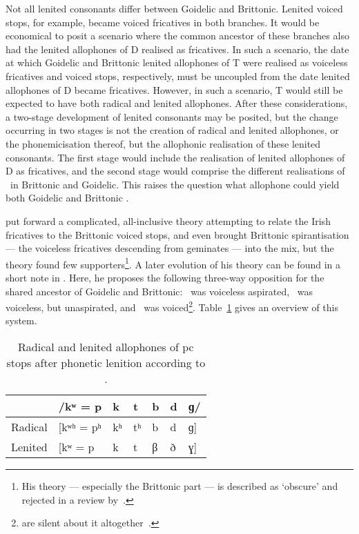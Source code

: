 Not all lenited consonants differ between Goidelic and Brittonic. Lenited voiced stops, for example, became voiced fricatives in both branches. It would be economical to posit a scenario where the common ancestor of these branches also had the lenited allophones of \gls{D} realised as fricatives. In such a scenario, the date at which Goidelic and Brittonic lenited allophones of \gls{T} were realised as voiceless fricatives and voiced stops, respectively, must be uncoupled from the date lenited allophones of \gls{D} became fricatives. However, in such a scenario, \gls{T} would still be expected to have both radical and lenited allophones.  After these considerations, a two-stage development of lenited consonants may be posited, but the change occurring in two stages is not the creation of radical and lenited allophones, or the phonemicisation thereof, but the allophonic realisation of these lenited consonants. The first stage would include the realisation of lenited allophones of \gls{D} as fricatives, and the second stage would comprise the different realisations of \lT\ in Brittonic and Goidelic. This raises the question what allophone could yield both Goidelic and Brittonic \lT.

\Textcite{Ped_Aspirationen97} put forward a complicated, all-inclusive theory attempting to relate the Irish fricatives to the Brittonic voiced stops, and even brought Brittonic spirantisation — the voiceless fricatives descending from geminates — into the mix, but the theory found few supporters\footnote{His theory — especially the Brittonic part — is described as `obscure' and rejected in a review by~\textcite{Str_Erschienene99}.}. A later evolution of his theory can be found in a short note in  \textcite[§§~149,~303]{Ped_Vergleichende09}. Here, he proposes the following three-way opposition for the shared ancestor of Goidelic and Brittonic: \xT\ was voiceless aspirated, \lT\ was voiceless, but unaspirated, and \xD\ was voiced\footnote{\Textcite{LP_Concise37} are silent about it altogether~\autocite[§~131]{jackson_language_1953}.}. Table~\ref{tab:pedersenstops} gives an overview of this system.

\begin{table}[h]
  \centering
  \begin{tabular}{lllllll}
    \toprule
    &/kʷ = p & k & t & b & d & ɡ/ \\\midrule
    Radical &[kʷʰ = pʰ& kʰ& tʰ& b & d & ɡ] \\ 
    Lenited &[kʷ = p & k & t & β & ð & ɣ]\\
    \bottomrule
  \end{tabular}
\caption{Radical and lenited allophones of \gls{pc} stops after phonetic lenition according to \textcite[§§~149,~303]{Ped_Vergleichende09}.}
\label{tab:pedersenstops}
\end{table}


